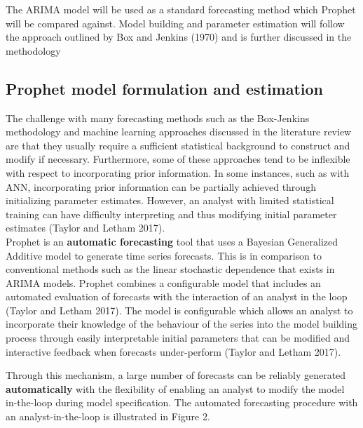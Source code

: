 \documentclass[12pt,a4paper]{article}
\numberwithin{equation}{section}
\numberwithin{figure}{section}
\numberwithin{table}{section}
\begin{document}
The ARIMA model will be used as a standard forecasting method which
Prophet will be compared against. Model building and parameter
estimation will follow the approach outlined by Box and Jenkins (1970)
and is further discussed in the methodology

\subsection{Prophet model formulation and
estimation}\label{prophet-model-formulation-and-estimation}

The challenge with many forecasting methods such as the Box-Jenkins
methodology and machine learning approaches discussed in the literature
review are that they usually require a sufficient statistical background
to construct and modify if necessary. Furthermore, some of these
approaches tend to be inflexible with respect to incorporating prior
information. In some instances, such as with ANN, incorporating prior
information can be partially achieved through initializing parameter
estimates. However, an analyst with limited statistical training can
have difficulty interpreting and thus modifying initial parameter
estimates (Taylor and Letham 2017).\\
Prophet is an \textbf{automatic forecasting} tool that uses a Bayesian
Generalized Additive model to generate time series forecasts. This is in
comparison to conventional methods such as the linear stochastic
dependence that exists in ARIMA models. Prophet combines a configurable
model that includes an automated evaluation of forecasts with the
interaction of an analyst in the loop (Taylor and Letham 2017). The
model is configurable which allows an analyst to incorporate their
knowledge of the behaviour of the series into the model building process
through easily interpretable initial parameters that can be modified and
interactive feedback when forecasts under-perform (Taylor and Letham
2017).

Through this mechanism, a large number of forecasts can be reliably
generated \textbf{automatically} with the flexibility of enabling an
analyst to modify the model in-the-loop during model specification. The
automated forecasting procedure with an analyst-in-the-loop is
illustrated in Figure 2.
\end{document}
